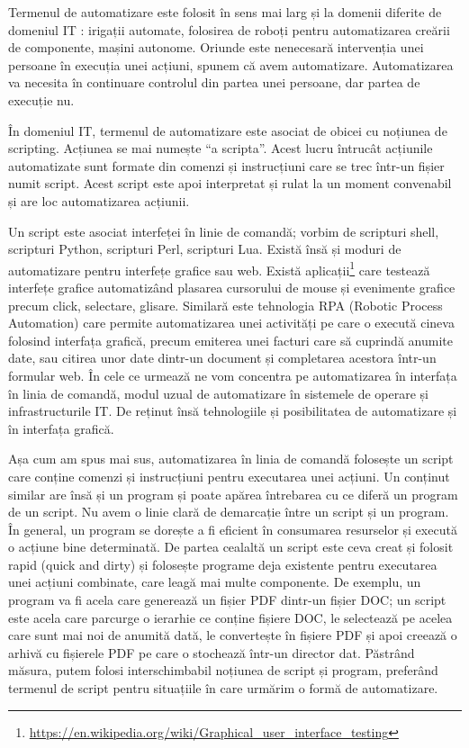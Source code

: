 Termenul de automatizare este folosit în sens mai larg și la domenii diferite de
domeniul IT : irigații automate, folosirea de
roboți pentru automatizarea creării de componente, mașini autonome. Oriunde este
nenecesară intervenția unei persoane în execuția unei acțiuni, spunem că avem
automatizare. Automatizarea va necesita în continuare controlul din partea unei
persoane, dar partea de execuție nu.

În domeniul IT, termenul de automatizare este asociat de obicei cu noțiunea de
scripting. Acțiunea se mai numește “a scripta”. Acest lucru întrucât acțiunile
automatizate sunt formate din comenzi și instrucțiuni care se trec într-un
fișier numit script. Acest script este apoi interpretat și rulat la un moment
convenabil și are loc automatizarea acțiunii.

Un script este asociat interfeței în linie de comandă; vorbim de scripturi
shell, scripturi Python, scripturi Perl, scripturi Lua. Există însă și moduri de
automatizare pentru interfețe grafice sau web. Există
aplicații\footnote{\url{https://en.wikipedia.org/wiki/Graphical_user_interface_testing}}
care testează interfețe grafice automatizând plasarea cursorului de mouse și
evenimente grafice precum click, selectare, glisare. Similară este tehnologia
RPA (Robotic Process Automation) care permite automatizarea unei activități pe
care o execută cineva folosind interfața grafică, precum emiterea unei facturi
care să cuprindă anumite date, sau citirea unor date dintr-un document și
completarea acestora într-un formular web. În cele ce urmează ne vom concentra
pe automatizarea în interfața în linia de comandă, modul uzual de automatizare
în sistemele de operare și infrastructurile IT. De reținut însă tehnologiile și
posibilitatea de automatizare și în interfața grafică.

Așa cum am spus mai sus, automatizarea în linia de comandă folosește un script
care conține comenzi și instrucțiuni pentru executarea unei acțiuni. Un conținut
similar are însă și un program și poate apărea întrebarea cu ce diferă un
program de un script. Nu avem o linie clară de demarcație între un script și un
program. În general, un program se dorește a fi eficient în consumarea
resurselor și execută o acțiune bine determinată. De partea cealaltă un script
este ceva creat și folosit rapid (quick and dirty) și folosește programe deja
existente pentru executarea unei acțiuni combinate, care leagă mai multe
componente. De exemplu, un program va fi acela care generează un fișier PDF
 dintr-un fișier DOC; un script este acela
care parcurge o ierarhie ce conține fișiere DOC, le selectează pe acelea care
sunt mai noi de anumită dată, le convertește în fișiere PDF și apoi creează o
arhivă cu fișierele PDF pe care o stochează într-un director dat. Păstrând
măsura, putem folosi interschimbabil noțiunea de script și program, preferând
termenul de script pentru situațiile în care urmărim o formă de automatizare.

